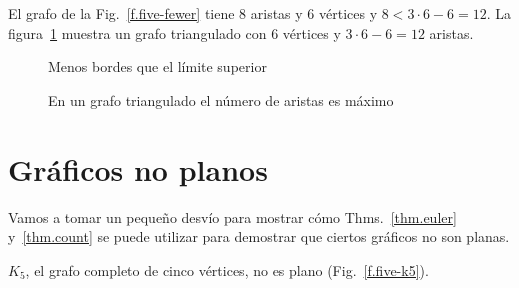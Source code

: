 \begin{example}
El grafo de la Fig.~\ref{f.five-fewer} tiene $8$ aristas y $6$ vértices y $8< 3\cdot 6 - 6= 12$.
La figura~\ref{f.five-upper-limit} muestra un grafo triangulado con $6$ vértices y $3\cdot 6 - 6= 12$ aristas.
\end{example}

\begin{figure}[t]
\begin{minipage}{.4\textwidth}
\begin{center}
\caption{Menos bordes que el límite superior}\label{f.five-fewer}
\end{center}
\end{minipage}
\hfill
\begin{minipage}{.55\textwidth}
\begin{center}
\caption{En un grafo triangulado el número de aristas es máximo}\label{f.five-upper-limit}
\end{center}
\end{minipage}
\end{figure}


\section{Gráficos no planos}\label{s.nonplanar}

Vamos a tomar un pequeño desvío para mostrar cómo Thms.~\ref{thm.euler} y~\ref{thm.count} se puede utilizar para demostrar que ciertos gráficos no son planas.

\begin{theorem}
$K_5$, el grafo completo de cinco vértices, no es plano (Fig.~\ref{f.five-k5}).
\end{theorem}

